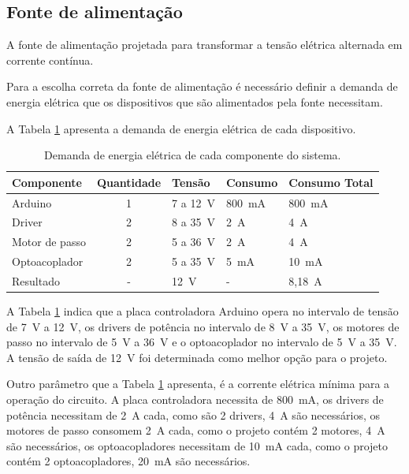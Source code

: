 \subsection{Fonte de alimentação}\label{subsec:metfonte}

A fonte de alimentação projetada para transformar a tensão elétrica alternada em corrente contínua.

Para a escolha correta da fonte de alimentação é necessário definir a demanda de energia elétrica 
que os dispositivos que são alimentados pela fonte necessitam.

A Tabela \ref{tab:demandafonte} apresenta a demanda de energia elétrica de cada dispositivo.

\begin{table}[H]
    \footnotesize
    \centering
    \caption{Demanda de energia elétrica de cada componente do sistema.}
    \begin{tabular}{lclll}
        \hline
        \textbf{Componente} & \textbf{Quantidade} & \textbf{Tensão} & \textbf{Consumo} & \textbf{Consumo Total}\\
        \hline
        Arduino & 1 & 7 a 12~V & 800~mA & 800~mA\\
        Driver & 2 & 8 a 35~V & 2~A & 4~A\\
        Motor de passo & 2 & 5 a 36~V & 2~A & 4~A\\
        Optoacoplador & 2 & 5 a 35~V & 5~mA & 10~mA\\
        Resultado & - & 12~V & - & 8,18~A\\
        \hline       
    \end{tabular}
    \label{tab:demandafonte}
\end{table}

A Tabela \ref{tab:demandafonte} indica que a placa controladora Arduino opera no intervalo de tensão de 7~V 
a 12~V, os drivers de potência no intervalo de 8~V a 35~V, os motores de passo no intervalo de 5~V a 36~V 
e o optoacoplador no intervalo de 5~V a 35~V. A tensão de saída de 12~V foi determinada como melhor 
opção para o projeto.

Outro parâmetro que a Tabela \ref{tab:demandafonte} apresenta, é a corrente elétrica mínima para a operação 
do circuito. A placa controladora necessita de 800~mA, os drivers de potência necessitam de 2~A cada, 
como são 2 drivers, 4~A são necessários, os motores de passo consomem 2~A cada, como o projeto 
contém 2 motores, 4~A são necessários, os optoacopladores necessitam de 10~mA cada, como o 
projeto contém 2 optoacopladores, 20~mA são necessários. 

